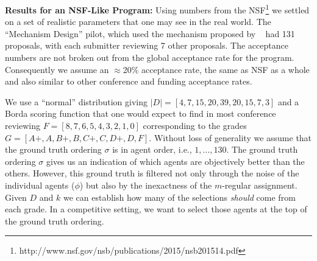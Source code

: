 \documentclass[letterpaper]{article}
\newcommand{\citet}[1]{\citeauthor{#1}~\shortcite{#1}}
\begin{document}
\smallskip
\noindent
\textbf{Results for an NSF-Like Program:}
Using numbers from the NSF\footnote{http://www.nsf.gov/nsb/publications/2015/nsb201514.pdf} we settled on a set of realistic parameters that one may see in the real world. The ``Mechanism Design'' pilot, which used the mechanism proposed by \citet{MeSa09a} had 131 proposals, with each submitter reviewing 7 other proposals.
The acceptance numbers are not broken out from the global acceptance rate for the program. Consequently we assume an $\approx$20\% acceptance rate, the same as NSF as a whole and also similar to other conference and funding acceptance rates.

We use a ``normal'' distribution %
giving $|D| = [4, 7, 15, 20, 39, 20, 15, 7, 3]$
and a Borda scoring function that one would expect to find in most conference reviewing
$F = [8, 7, 6, 5, 4, 3, 2, 1, 0]$ corresponding to the grades $G = [A+, A, B+, B, C+, C, D+, D, F]$. Without loss of generality we assume that the ground truth ordering $\sigma$ is in agent order, i.e., $1, \ldots, 130$.
The ground truth ordering $\sigma$ gives us an indication of which agents are objectively better
than the others. However, this ground truth is filtered not only through the noise of the individual
agents ($\phi$) but also by the inexactness of the $m$-regular assignment. Given $D$ and $k$ we can
establish how many of the selections \emph{should} come from each grade.
In a competitive setting, we want to select those agents at the top of the ground truth ordering.
\end{document}
